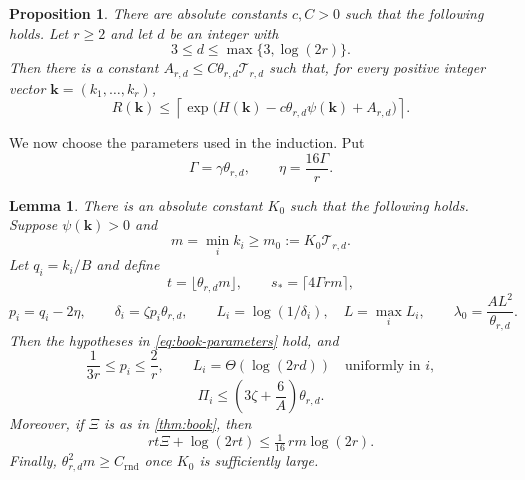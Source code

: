 \documentclass[11pt]{article}
\newtheorem{lemma}[theorem]{Lemma}
\newtheorem{proposition}[theorem]{Proposition}
\theoremstyle{definition}
\newcommand{\kk}{\mathbf k}
\newcommand{\Ent}{H}
\newcommand{\pot}{\psi}
\begin{document}
\begin{proposition}\label{thm:offdiag-flex}
There are absolute constants $c,C>0$ such that the following holds.  Let
$r\ge2$ and let $d$ be an integer with
\[
 3\le d\le\max\{3,\log(2r)\}.
\]
Then there is a constant $A_{r,d}\le C\theta_{r,d}\mathcal T_{r,d}$ such that,
for every positive integer vector $\kk=(k_1,\ldots,k_r)$,
\[
 R(\kk)\le
 \left\lceil
 \exp\bigl(\Ent(\kk)-c\theta_{r,d}\pot(\kk)+A_{r,d}\bigr)
 \right\rceil.
\]
\end{proposition}

We now choose the parameters used in the induction.  Put
\begin{equation}\label{eq:Gamma-eta}
 \Gamma=\gamma\theta_{r,d},
 \qquad
 \eta=\frac{16\Gamma}{r}.
\end{equation}

\begin{lemma}\label{lem:parameters}
There is an absolute constant $K_0$ such that the following holds.  Suppose
$\pot(\kk)>0$ and
\[
 m=\min_i k_i\ge m_0:=K_0\mathcal T_{r,d}.
\]
Let $q_i=k_i/B$ and define
\begin{equation}\label{eq:t-sstar}
 t=\lfloor\theta_{r,d}m\rfloor,
 \qquad
 s_\ast=\lceil4\Gamma rm\rceil,
\end{equation}
\[
 p_i=q_i-2\eta,
 \qquad
 \delta_i=\zeta p_i\theta_{r,d},
 \qquad
 L_i=\log(1/\delta_i),\quad L=\max_iL_i,
 \qquad
 \lambda_0=\frac{AL^2}{\theta_{r,d}}.
\]
Then the hypotheses in \eqref{eq:book-parameters} hold, and
\begin{equation}\label{eq:p-window}
 \frac1{3r}\le p_i\le\frac2r,
 \qquad
 L_i=\Theta(\log(2rd))\quad\text{uniformly in $i$},
\end{equation}
\begin{equation}\label{eq:Pi-bound}
 \Pi_i\le\left(3\zeta+\frac6A\right)\theta_{r,d}.
\end{equation}
Moreover, if $\Xi$ is as in \cref{thm:book}, then
\begin{equation}\label{eq:Xi-bound}
 rt\Xi+\log(2rt)\le\tfrac1{16}\,rm\log(2r).
\end{equation}
Finally, $\theta_{r,d}^2m\ge C_{\mathrm{rnd}}$ once $K_0$ is sufficiently
large.
\end{lemma}
\end{document}
